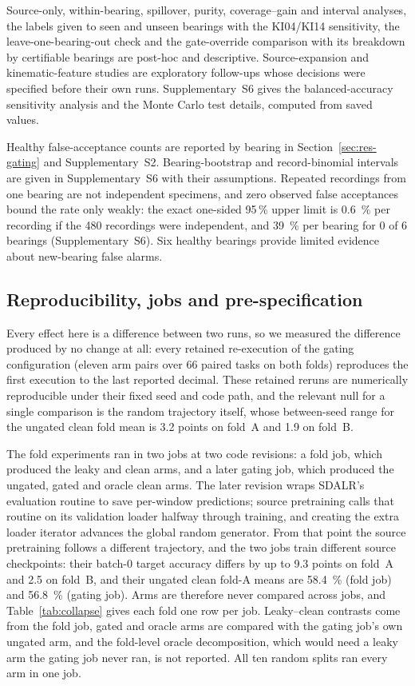 Source-only, within-bearing, spillover, purity, coverage--gain and interval analyses, the labels given to seen and unseen bearings with the KI04/KI14 sensitivity, the leave-one-bearing-out check and the gate-override comparison with its breakdown by certifiable bearings are post-hoc and descriptive. Source-expansion and kinematic-feature studies are exploratory follow-ups whose decisions were specified before their own runs. Supplementary~S6 gives the balanced-accuracy sensitivity analysis and the Monte Carlo test details, computed from saved values.

Healthy false-acceptance counts are reported by bearing in Section~\ref{sec:res-gating} and Supplementary~S2. Bearing-bootstrap and record-binomial intervals are given in Supplementary~S6 with their assumptions. Repeated recordings from one bearing are not independent specimens, and zero observed false acceptances bound the rate only weakly: the exact one-sided 95\,\% upper limit is \SI{0.6}{\percent} per recording if the 480 recordings were independent, and \SI{39}{\percent} per bearing for 0 of 6 bearings (Supplementary~S6). Six healthy bearings provide limited evidence about new-bearing false alarms.

\subsection{Reproducibility, jobs and pre-specification}
\label{sec:repro-jobs}

Every effect here is a difference between two runs, so we measured the difference produced by no change at all: every
retained re-execution of the gating configuration (eleven arm pairs over 66 paired tasks on both folds) reproduces the
first execution to the last reported decimal. These retained reruns are numerically reproducible under their fixed seed and code path, and the
relevant null for a single comparison is the random trajectory itself, whose between-seed range for the ungated clean fold
mean is 3.2 points on fold~A and 1.9 on fold~B.

The fold experiments ran in two jobs at two code revisions: a fold job, which produced the leaky and clean arms, and a later
gating job, which produced the ungated, gated and oracle clean arms. The later revision wraps SDALR's evaluation routine to
save per-window predictions; source pretraining calls that routine on its validation loader halfway through training, and
creating the extra loader iterator advances the global random generator. From that point the source pretraining follows a
different trajectory, and the two jobs train different source checkpoints: their batch-0 target accuracy differs by up to
9.3 points on fold~A and 2.5 on fold~B, and their ungated clean fold-A means are \SI{58.4}{\percent} (fold job) and
\SI{56.8}{\percent} (gating job). Arms are therefore never compared across jobs, and Table~\ref{tab:collapse} gives each
fold one row per job. Leaky--clean contrasts come from the fold job, gated and oracle arms are compared with
the gating job's own ungated arm, and the fold-level oracle decomposition, which would need a leaky arm the gating job never
ran, is not reported. All ten random splits ran every arm in one job.

